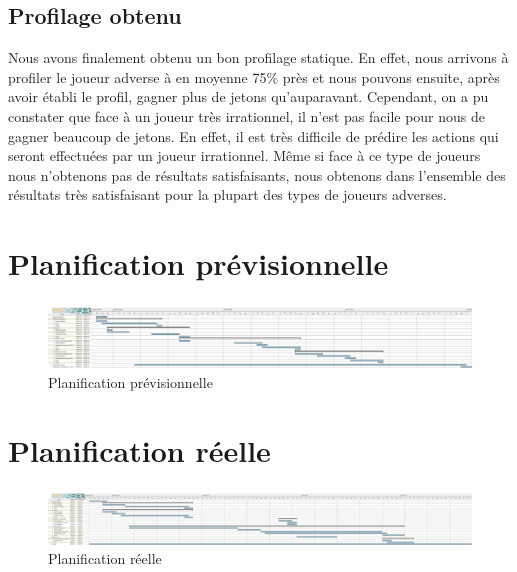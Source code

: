 \documentclass{report}
\begin{document}
\section{Profilage obtenu}
\hspace{0.5cm}Nous avons finalement obtenu un bon profilage statique. En effet, nous arrivons à profiler le joueur adverse à en moyenne 75\% près et nous pouvons ensuite, après avoir établi le profil, gagner plus de jetons qu’auparavant. Cependant, on a pu constater que face à un joueur très irrationnel, il n'est pas facile pour nous de gagner beaucoup de jetons. En effet, il est très difficile de prédire les actions qui seront effectuées par un joueur irrationnel. Même si face à ce type de joueurs nous n'obtenons pas de résultats satisfaisants, nous obtenons dans l'ensemble des résultats très satisfaisant pour la plupart des types de joueurs adverses.\par







\nocite{*}


\appendix
\chapter{Planification prévisionnelle}
	\begin{figure}
		 \hspace{-4cm} 
			\includegraphics[scale=0.4]{../DiagrammePrevisionnel.png}
			\caption[Planification prévisionnelle]{Planification prévisionnelle}
	\end{figure}
	\medskip
		
\chapter{Planification réelle}
	\begin{figure}
		 \hspace{-4cm} 
			\includegraphics[scale=0.4]{./imagesRapport/DiagrammeReel.png}
			\caption[Planification réelle]{Planification réelle}
	\end{figure}
	\medskip
		
		
		
\end{document}
